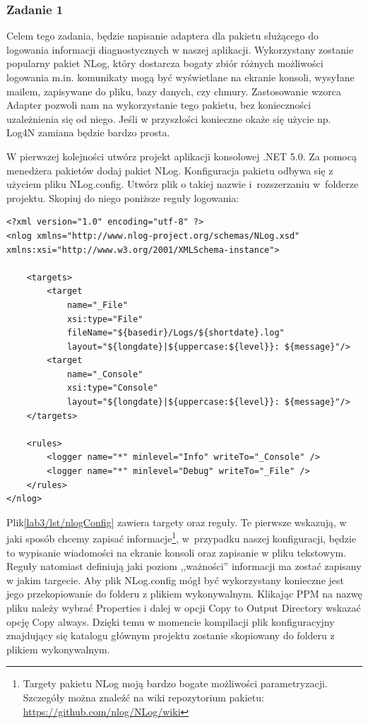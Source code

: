 
\subsubsection{Zadanie 1}
Celem tego zadania, będzie napisanie adaptera dla pakietu służącego do logowania informacji diagnostycznych w naszej aplikacji. Wykorzystany zostanie popularny pakiet NLog, który dostarcza bogaty zbiór różnych możliwości logowania m.in. komunikaty mogą być wyświetlane na ekranie konsoli, wysyłane mailem, zapisywane do pliku, bazy danych, czy chmury. Zastosowanie wzorca Adapter pozwoli nam na wykorzystanie tego pakietu, bez konieczności uzależnienia się od niego. Jeśli w przyszłości konieczne okaże się użycie np. Log4N zamiana będzie bardzo prosta.  

W pierwszej kolejności utwórz projekt aplikacji konsolowej .NET 5.0. Za pomocą menedżera pakietów dodaj pakiet NLog. Konfiguracja pakietu odbywa się z użyciem pliku NLog.config. Utwórz plik o takiej nazwie i~rozszerzaniu w~folderze projektu. Skopiuj do niego poniższe reguły logowania:
\begin{lstlisting}[caption={Konfiguracja pakietu NLog}, label={lab3/lst/nlogConfig}]
<?xml version="1.0" encoding="utf-8" ?>
<nlog xmlns="http://www.nlog-project.org/schemas/NLog.xsd"
xmlns:xsi="http://www.w3.org/2001/XMLSchema-instance">

	<targets>
		<target 
			name="_File" 
			xsi:type="File" 
			fileName="${basedir}/Logs/${shortdate}.log" 
			layout="${longdate}|${uppercase:${level}}: ${message}"/>
		<target 
			name="_Console" 
			xsi:type="Console" 
			layout="${longdate}|${uppercase:${level}}: ${message}"/>
	</targets>
	
	<rules>
		<logger name="*" minlevel="Info" writeTo="_Console" />
		<logger name="*" minlevel="Debug" writeTo="_File" />
	</rules>
</nlog>
\end{lstlisting}
Plik\ref{lab3/lst/nlogConfig} zawiera targety oraz reguły. Te pierwsze wskazują, w jaki sposób chcemy zapisać informacje\footnote{Targety pakietu NLog moją bardzo bogate możliwości parametryzacji. Szczegóły można znaleźć na wiki repozytorium pakietu: \url{https://github.com/nlog/NLog/wiki}}, w~przypadku naszej konfiguracji, będzie to wypisanie wiadomości na ekranie konsoli oraz zapisanie w pliku tekstowym. Reguły natomiast definiują jaki poziom ,,ważności'' informacji ma zostać zapisany w jakim targecie. Aby plik NLog.config mógł być wykorzystany konieczne jest jego przekopiowanie do folderu z plikiem wykonywalnym. Klikając PPM na nazwę pliku należy wybrać Properties i dalej w opcji Copy to Output Directory wskazać opcję Copy always. Dzięki temu w momencie kompilacji plik konfiguracyjny znajdujący się katalogu głównym projektu zostanie skopiowany do folderu z plikiem wykonywalnym.

